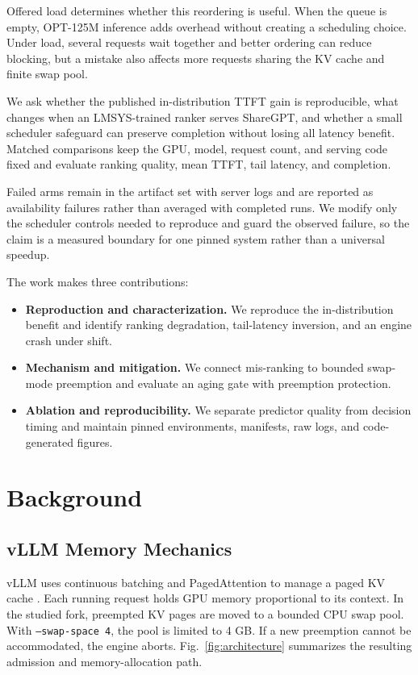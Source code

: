 \documentclass[conference]{IEEEtran}
\begin{document}
Offered load determines whether this reordering is useful. When the queue is empty, OPT-125M inference adds overhead without creating a scheduling choice. Under load, several requests wait together and better ordering can reduce blocking, but a mistake also affects more requests sharing the KV cache and finite swap pool.

We ask whether the published in-distribution TTFT gain is reproducible, what changes when an LMSYS-trained ranker serves ShareGPT, and whether a small scheduler safeguard can preserve completion without losing all latency benefit. Matched comparisons keep the GPU, model, request count, and serving code fixed and evaluate ranking quality, mean TTFT, tail latency, and completion.

Failed arms remain in the artifact set with server logs and are reported as availability failures rather than averaged with completed runs. We modify only the scheduler controls needed to reproduce and guard the observed failure, so the claim is a measured boundary for one pinned system rather than a universal speedup.

The work makes three contributions:
\begin{itemize}
    \item \textbf{Reproduction and characterization.} We reproduce the in-distribution benefit and identify ranking degradation, tail-latency inversion, and an engine crash under shift.
    \item \textbf{Mechanism and mitigation.} We connect mis-ranking to bounded swap-mode preemption and evaluate an aging gate with preemption protection.
    \item \textbf{Ablation and reproducibility.} We separate predictor quality from decision timing and maintain pinned environments, manifests, raw logs, and code-generated figures.
\end{itemize}

\newpage
\section{Background}
\subsection{vLLM Memory Mechanics}
vLLM uses continuous batching and PagedAttention to manage a paged KV cache \cite{kwon2023pagedattention}. Each running request holds GPU memory proportional to its context. In the studied fork, preempted KV pages are moved to a bounded CPU swap pool. With \texttt{--swap-space 4}, the pool is limited to 4 GB. If a new preemption cannot be accommodated, the engine aborts. Fig.~\ref{fig:architecture} summarizes the resulting admission and memory-allocation path.
\end{document}
